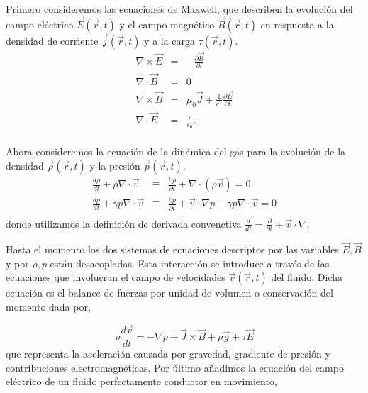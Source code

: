\documentclass[a4paper,11pt]{report}
\begin{document}
Primero consideremos las ecuaciones de Maxwell, que describen la evolución del campo eléctrico $\vec{E}(\vec{r},t)$ y el campo magnético $\vec{B}(\vec{r},t)$ en respuesta a la densidad de corriente $\vec{j}(\vec{r},t)$ y a la carga $\tau(\vec{r},t)$.
\begin{eqnarray}
\nabla \times \vec{E} &=& -\frac{\partial\vec{B}}{\partial t} \label{faraday}\\ 
\nabla \cdot \vec{B} &=& 0 \\
\nabla \times \vec{B} &=& \mu_0 \vec{J} + \frac{1}{c^2}\frac{\partial\vec{E}}{\partial t}\label{ampere}\\
\nabla \cdot \vec{E} &=& \frac{\tau}{\epsilon_0}. \label{poisson}\\
\end{eqnarray}


Ahora consideremos la ecuación de la dinámica del gas para la evolución de la densidad $\vec{\rho}(\vec{r},t)$ y la presión $\vec{p}(\vec{r},t)$.
\begin{eqnarray}
\frac{d\rho}{dt} + \rho \nabla \cdot \vec{v} &\equiv& \frac{\partial \rho}{\partial t} +\nabla \cdot (\rho \vec{v}) = 0\\
\frac{d p}{dt} + \gamma p \nabla \cdot \vec{v} &\equiv& \frac{\partial p}{\partial t} + \vec{v} \cdot \nabla p + \gamma p \nabla \cdot \vec{v} = 0\\
\end{eqnarray}
donde utilizamos la definición de derivada convenctiva $\frac{d}{dt}=\frac{\partial}{\partial t} + \vec{v} \cdot \nabla$. 

Hasta el momento los dos sistemas de ecuaciones descriptos por las variables $\vec{E}, \vec{B}$ y por $\rho, p$ están desacopladas. Esta interacción se introduce a través de las ecuaciones que involucran el campo de velocidades $\vec{v}(\vec{r},t)$ del fluido. Dicha ecuación es el balance de fuerzas por unidad de volumen o conservación del momento dada por,

\begin{equation}
\rho \frac{d\vec{v}}{dt} = - \nabla p + \vec{J} \times \vec{B} +\rho \vec{g} +\tau \vec{E} \label{momento}
\end{equation}
que representa la aceleración causada por gravedad, gradiente de presión y contribuciones electromagnéticas.
Por último añadimos la ecuación del campo eléctrico de un fluido perfectamente conductor en movimiento,
\end{document}
